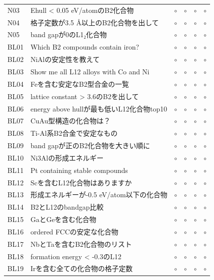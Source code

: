 \documentclass[3p]{elsarticle}
\begin{document}
\begin{longtable}{lp{5.5cm}cccc}
  N03 & Ehull < 0.05 eV/atomのB2化合物 & $\circ$ & $\circ$ & $\circ$ & $\circ$ \\
  N04 & 格子定数が3.5 Å以上のB2化合物を出して & $\circ$ & $\circ$ & $\circ$ & $\circ$ \\
  N05 & band gapが0のL1₂化合物 & $\circ$ & $\circ$ & $\circ$ & $\circ$ \\
  BL01 & Which B2 compounds contain iron? & $\circ$ & $\circ$ & $\circ$ & $\circ$ \\
  BL02 & NiAlの安定性を教えて & $\circ$ & $\circ$ & $\circ$ & $\circ$ \\
  BL03 & Show me all L12 alloys with Co and Ni & $\circ$ & $\circ$ & $\circ$ & $\circ$ \\
  BL04 & Feを含む安定なB2型合金の一覧 & $\circ$ & $\circ$ & $\circ$ & $\circ$ \\
  BL05 & lattice constant > 3.6のB2を出して & $\circ$ & $\circ$ & $\circ$ & $\circ$ \\
  BL06 & energy above hullが最も低いL12化合物top10 & $\circ$ & $\circ$ & $\circ$ & $\circ$ \\
  BL07 & CuAu型構造の化合物は？ & $\circ$ & $\circ$ & $\circ$ & $\circ$ \\
  BL08 & Ti-Al系B2合金で安定なもの & $\circ$ & $\circ$ & $\circ$ & $\circ$ \\
  BL09 & band gapが正のB2化合物を大きい順に & $\circ$ & $\circ$ & $\circ$ & $\circ$ \\
  BL10 & Ni3Alの形成エネルギー & $\circ$ & $\circ$ & $\circ$ & $\circ$ \\
  BL11 & Pt containing stable compounds & $\circ$ & $\circ$ & $\circ$ & $\circ$ \\
  BL12 & Scを含むL12化合物はありますか & $\circ$ & $\circ$ & $\circ$ & $\circ$ \\
  BL13 & 形成エネルギーが-0.5 eV/atom以下の化合物 & $\circ$ & $\circ$ & $\circ$ & $\circ$ \\
  BL14 & B2とL12のbandgap比較 & $\circ$ & $\circ$ & $\circ$ & $\circ$ \\
  BL15 & GaとGeを含む化合物 & $\circ$ & $\circ$ & $\circ$ & $\circ$ \\
  BL16 & ordered FCCの安定な化合物 & $\circ$ & $\circ$ & $\circ$ & $\circ$ \\
  BL17 & NbとTaを含むB2化合物のリスト & $\circ$ & $\circ$ & $\circ$ & $\circ$ \\
  BL18 & formation energy < -0.3のL12 & $\circ$ & $\circ$ & $\circ$ & $\circ$ \\
  BL19 & Irを含む全ての化合物の格子定数 & $\circ$ & $\circ$ & $\circ$ & $\circ$ \\

\end{longtable}
\end{document}

